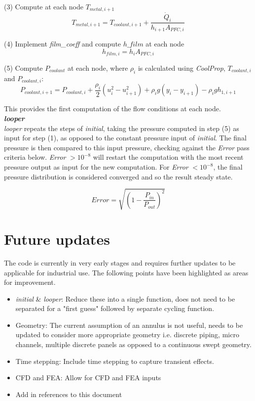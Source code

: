 \documentclass{article}
\begin{document}
(3) Compute at each node $T_{metal, i+1}$
\[T_{metal, i+1} = T_{coolant, i+1} + \frac{\dot{Q}_{i}}{h_{i+1} A_{PFC, i}}\]

(4) Implement \textit{film\_coeff} and compute $h\_{film}$ at each node
\[h_{film,i} = h_{i} A_{PFC, i}\]

(5) Compute $P_{coolant}$ at each node, where $\rho_{i}$ is calculated using \textit{CoolProp}, $T_{coolant,i}$ and $P_{coolant,i}$:
\[P_{coolant, i+1} = P_{coolant, i} + \frac{\rho_{i}}{2}(u^{2}_{i} - u^{2}_{i+1}) + \rho_{i} g (y_{i}-y_{i+1}) - \rho_{i} g h_{1, i+1}\]

This provides the first computation of the flow conditions at each node.\\

\textbf{\textit{looper}}\\

\textit{looper} repeats the steps of \textit{initial}, taking the pressure computed in step (5) as input for step (1), as opposed to the constant pressure input of \textit{initial}. The final pressure is then compared to this input pressure, checking against the \textit{Error} pass criteria below. \textit{Error} $>10^{-8}$ will restart the computation with the most recent pressure output as input for the new computation. For \textit{Error} $<10^{-8}$, the final pressure distribution is considered converged and so the result steady state.

\[Error = \sqrt{\left(1-\frac{P_{in}}{P_{out}}\right)^{2}}\]

\newpage

\section{Future updates}
The code is currently in very early stages and requires further updates to be applicable for industrial use. The following points have been highlighted as areas for improvement.

\begin{itemize}
	\item \textit{initial} \& \textit{looper}: Reduce these into a single function, does not need to be separated for a "first guess" followed by separate cycling function.
	\item Geometry: The current assumption of an annulus is not useful, needs to be updated to consider more appropriate geometry i.e. discrete piping, micro channels, multiple discrete panels as opposed to a continuous swept geometry.
	\item Time stepping: Include time stepping to capture transient effects.
	\item CFD and FEA: Allow for CFD and FEA inputs
	\item Add in references to this document
	
\end{itemize}
\end{document}
